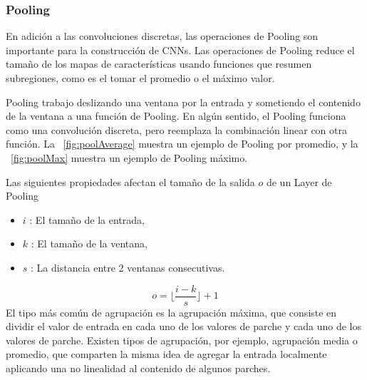 \subsubsection{Pooling }
En adición a las convoluciones discretas, las operaciones de \gls{Pooling} son importante para la construcción de \gls{CNN}s. Las operaciones de \gls{Pooling} reduce el tamaño de los mapas de características usando funciones que resumen subregiones, como es el tomar el promedio o el máximo valor. 

\gls{Pooling} trabajo deslizando una ventana por la entrada y sometiendo el contenido de la ventana a una función de \gls{Pooling}. En algún sentido, el \gls{Pooling} funciona como una convolución discreta, pero reemplaza la combinación linear con otra función. La \figurename~\ref{fig:poolAverage} muestra un ejemplo de \gls{Pooling} por promedio, y la \figurename~\ref{fig:poolMax} muestra un ejemplo de \gls{Pooling} máximo.

Las siguientes propiedades afectan el tamaño de la salida $o$ de un \gls{Layer} de \gls{Pooling} 
\begin{itemize}
    \item $i$ : El tamaño de la entrada,
    \item $k$ : El tamaño de la ventana,
    \item $s$ : La distancia entre 2 ventanas consecutivas.
 
\end{itemize}
\begin{equation}
    o = \lfloor\frac{i-k}{s}\rfloor+1
\end{equation}
El tipo más común de agrupación es la agrupación máxima, que consiste en dividir el valor de entrada en cada uno de los valores de parche y cada uno de los valores de parche. Existen tipos de agrupación, por ejemplo, agrupación media o promedio, que comparten la misma idea de agregar la entrada localmente aplicando una no linealidad al contenido de algunos parches\cite{boureau2010learning}.



